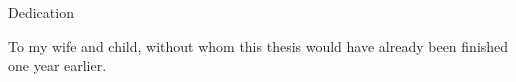 \baselineskip=25pt
\begin{center}
{Dedication}
\end{center}

\vskip 0.5in

To my wife and child, without whom this thesis would have already been finished one year earlier. 
